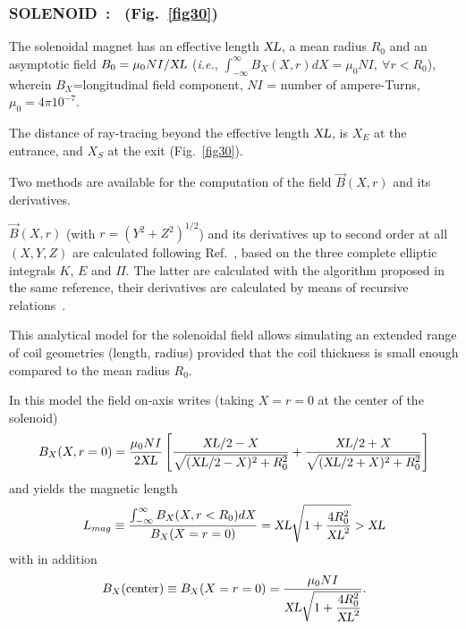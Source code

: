 {\newpage

\subsubsection*{SOLENOID~: \SOLENOIDTitl\ (Fig.~\protect\ref{fig30}) } \label{SOLENOID}  
\medskip 

 The solenoidal magnet has an effective length $ \textsl{XL}$,  a mean radius
$ R_0 $ and an asymptotic field  $ B_0=\mu_0 N I / \textsl{XL}$ (\emph{i.e.}, $\int_{-\infty}^\infty 
B_X(X,r) dX = \mu_0 N I, ~\forall r<R_0$), wherein $B_X$=longitudinal field component, 
$ NI $  = number of ampere-Turns, $\mu_0=4\pi  10^{-7} $. 
\medskip

\noindent The distance of ray-tracing beyond the effective length $ \textsl{XL}$,   is 
$X_E $ at the entrance, and $ X_S $ at the exit (Fig.~\ref{fig30}).   
\medskip

\noindent Two methods are available for the computation of the field $ \vec  B(X,r)$ and its derivatives. 


\medskip

   $ \vec  B(X,r)$ (with $r=(Y^2+Z^2)^{1/2} $) and its derivatives up to 
second order  at all $(X,Y,Z)$ are calculated following Ref.~\cite{Biblio17}, %
based on the three complete elliptic integrals $K$, $E $ and $\Pi$. The latter 
are calculated with the algorithm proposed in the same reference, their
derivatives are calculated by means of recursive relations~\cite{Biblio18}.  %

\medskip

\noindent This analytical model for the solenoidal field allows simulating an 
extended range of coil geometries (length, radius) 
provided that the coil thickness is small enough compared to the mean radius $ R_0 $. 
\medskip


\noindent In this model the field on-axis writes (taking $X=r=0$ at the center of the  solenoid) 
\begin{equation}
\label{EqSol}
B_X(X,r=0) = \dfrac{\mu_0 N I }{2 \textsl{XL}} \left[ \dfrac{\textsl{XL}/2-X}{\sqrt{(\textsl{XL}/2-X)^2+R_0^2}} 
+  \dfrac{\textsl{XL}/2+X}{\sqrt{(\textsl{XL}/2+X)^2+R_0^2}} \right]
\end{equation}
and yields the magnetic length 
\begin{equation}
\label{EqSol2}
L_{mag} \equiv  \dfrac{\int_{-\infty}^\infty B_X(X,r<R_0) dX }{B_X(X=r=0)} 
= \textsl{XL}\sqrt{1+\dfrac{4R_0^2 }{\textsl{XL}^2}} > \textsl{XL} 
\end{equation}
with in addition 
$$B_X(\textrm{center}) \equiv B_X(X=r=0) = 
      \dfrac{\mu_0 N I }{\textsl{XL}\sqrt{1+\dfrac{4R_0^2}{\textsl{XL}^2}}}.$$

}
